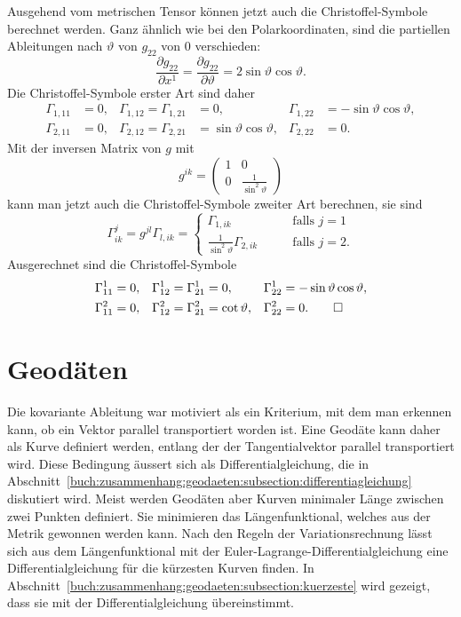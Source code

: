\begin{beispiel}
Ausgehend vom metrischen Tensor können jetzt auch die Christoffel-Symbole
berechnet werden.
Ganz ähnlich wie bei den Polarkoordinaten, sind
die partiellen Ableitungen nach $\vartheta$ von $g_{22}$ von $0$
verschieden:
\[
\frac{\partial g_{22}}{\partial x^1}
=
\frac{\partial g_{22}}{\partial\vartheta}
=
2\sin\vartheta\cos\vartheta.
\]
Die Christoffel-Symbole erster Art sind daher
\[
\begin{aligned}
\Gamma_{1,11}
&=
0,
&
\Gamma_{1,12} = \Gamma_{1,21}
&=
0,
&
\Gamma_{1,22}
&=
-\sin\vartheta\cos\vartheta,
\\
\Gamma_{2,11}
&=
0,
&
\Gamma_{2,12} = \Gamma_{2,21}
&=
\sin\vartheta\cos\vartheta,
&
\Gamma_{2,22}
&=
0.
\end{aligned}
\]
Mit der inversen Matrix von $g$ mit
\[
g^{ik}
=
\begin{pmatrix}
1&0\\
0&\frac{1}{\sin^2\vartheta}
\end{pmatrix}
\]
kann man jetzt auch die Christoffel-Symbole zweiter Art berechnen,
sie sind
\[
\Gamma^j_{ik}
=
g^{jl}\Gamma_{l,ik}
=
\begin{cases}
\Gamma_{1,ik}&\qquad\text{falls $j=1$}\\
\frac{1}{\sin^2\vartheta}\Gamma_{2,ik}&\qquad\text{falls $j=2$}.
\end{cases}
\]
Ausgerechnet sind die Christoffel-Symbole
\[
\begin{aligned}
\Gamma^1_{11}
&=
0,
&
\Gamma^1_{12}
=
\Gamma^1_{21}
&=
0,
&
\Gamma^1_{22}
&=
-\sin\vartheta\cos\vartheta,
\\
\Gamma^2_{11}
&=
0,
&
\Gamma^2_{12}
=
\Gamma^2_{21}
&=
\cot\vartheta,
&
\Gamma^2_{22}
&=
0.
\qedhere
\end{aligned}
\]
\end{beispiel}

%
%
\section{Geodäten
\label{buch:zusammenhang:section:geodaeten}}
Die kovariante Ableitung war motiviert als ein Kriterium, mit
dem man erkennen kann, ob ein Vektor parallel transportiert
worden ist.
Eine Geodäte kann daher als Kurve definiert werden, entlang der
der Tangentialvektor parallel transportiert wird.
Diese Bedingung äussert sich als Differentialgleichung, die in
Abschnitt~\ref{buch:zusammenhang:geodaeten:subsection:differentiagleichung}
diskutiert wird.
Meist werden Geodäten aber Kurven minimaler Länge zwischen zwei Punkten
definiert.
Sie minimieren das Längenfunktional, welches aus der Metrik gewonnen
werden kann.
Nach den Regeln der Variationsrechnung lässt sich aus dem Längenfunktional
mit der Euler-Lagrange-Differentialgleichung eine Differentialgleichung
für die kürzesten Kurven finden.
In Abschnitt~\ref{buch:zusammenhang:geodaeten:subsection:kuerzeste}
wird gezeigt, dass sie mit der Differentialgleichung übereinstimmt.

